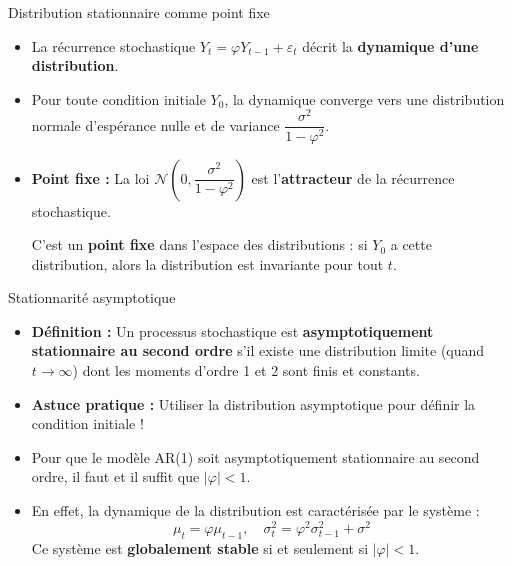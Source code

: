 \documentclass[11pt,aspectratio=169]{beamer}
\begin{document}
\begin{frame}{Distribution stationnaire comme point fixe}

\begin{itemize}

\item La récurrence stochastique $Y_t = \varphi Y_{t-1} + \varepsilon_t$ décrit la \textbf{dynamique d'une distribution}.\newline

\item Pour toute condition initiale $Y_0$, la dynamique converge vers une distribution normale d'espérance nulle et de variance $\dfrac{\sigma^2}{1-\varphi^2}$.\newline

\item \textbf{Point fixe :} La loi $\mathcal{N}\left(0, \dfrac{\sigma^2}{1-\varphi^2}\right)$ est l'\textbf{attracteur} de la récurrence stochastique.



C'est un \textbf{point fixe} dans l'espace des distributions : si $Y_0$ a cette distribution, alors la distribution est invariante pour tout $t$.

\end{itemize}
\end{frame}

\begin{frame}{Stationnarité asymptotique}

\begin{itemize}

\item \textbf{Définition :} Un processus stochastique est \textbf{asymptotiquement stationnaire au second ordre} s'il existe une distribution limite (quand $t \to \infty$) dont les moments d'ordre 1 et 2 sont finis et constants.\newline

\item \textbf{Astuce pratique :} Utiliser la distribution asymptotique pour définir la condition initiale !\newline

\item Pour que le modèle AR(1) soit asymptotiquement stationnaire au second ordre, il faut et il suffit que $|\varphi| < 1$.\newline

\item En effet, la dynamique de la distribution est caractérisée par le système :
\[
\mu_t = \varphi \mu_{t-1}, \quad \sigma_t^2 = \varphi^2 \sigma_{t-1}^2 + \sigma^2
\]
Ce système est \textbf{globalement stable} si et seulement si $|\varphi| < 1$.

\end{itemize}
\end{frame}
\end{document}
